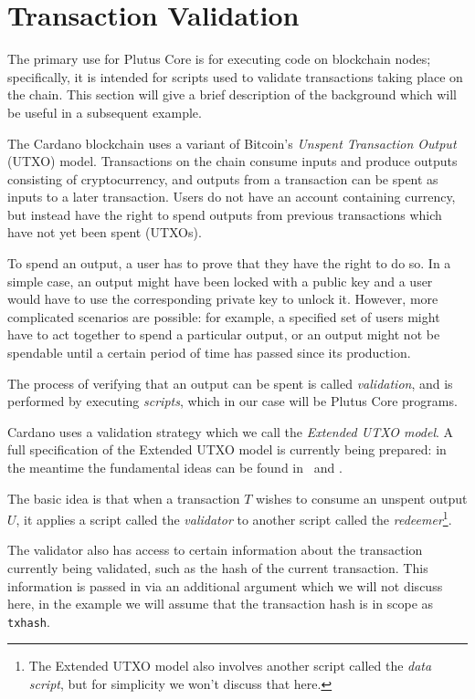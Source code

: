 \documentclass[a4paper]{article}
\begin{document}
\section{Transaction Validation}
The primary use for Plutus Core is for executing code on blockchain
nodes; specifically, it is intended for scripts used to validate
transactions taking place on the chain.  This section will give a
brief description of the background which will be useful in a
subsequent example.

The Cardano blockchain uses a variant of Bitcoin's \emph{Unspent
  Transaction Output} (UTXO) model.  Transactions on the chain consume
inputs and produce outputs consisting of cryptocurrency, and outputs
from a transaction can be spent as inputs to a later transaction.
Users do not have an account containing currency, but instead have the
right to spend outputs from previous transactions which have not yet
been spent (UTXOs).

To spend an output, a user has to prove that they have the right to do
so.  In a simple case, an output might have been locked with a public
key and a user would have to use the corresponding private key to
unlock it.  However, more complicated scenarios are possible: for
example, a specified set of users might have to act together to spend
a particular output, or an output might not be spendable until a
certain period of time has passed since its production.

The process of verifying that an output can be spent is called
\emph{validation}, and is performed by executing \emph{scripts},
which in our case will be Plutus Core programs.

Cardano uses a validation strategy which we call the \emph{Extended
  UTXO model}.  A full specification of the Extended UTXO model is
currently being prepared: in the meantime the fundamental ideas can be
found in~\citep{Zahnentferner18-Chimeric} and
\citep{Zahnentferner18-UTxO}.

The basic idea is that when a transaction $T$ wishes to consume an
unspent output $U$, it applies a script called the \emph{validator}
to another script called the \emph{redeemer}\footnote{The Extended
  UTXO model also involves another script called the \emph{data
    script}, but for simplicity we won't discuss that here.}.

The validator also has access to certain information about the transaction
currently being validated, such as the hash of the current transaction. This
information is passed in via an additional argument which we will not discuss
here, in the example we will assume that the transaction hash is in scope as \texttt{txhash}.
\end{document}
